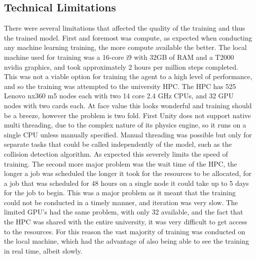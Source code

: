 \subsection{Technical Limitations}\label{sec:limitations}
There were several limitations that affected the quality of the training and thus the trained model. First and foremost was compute, as expected when conducting any machine learning training, the more compute available the better. The local machine used for training was a 16-core i9 with 32GB of RAM and a T2000 nvidia graphics, and took approximately 2 hours per million steps completed. This was not a viable option for training the agent to a high level of performance, and so the training was attempted to the university HPC. The HPC has 525 Lenovo nx360 m5 nodes each with two 14 core 2.4 GHz CPUs, and 32 GPU nodes with two cards each. At face value this looks wonderful and training should be a breeze, however the problem is two fold. First Unity does not support native multi threading, due to the complex nature of its physics engine, so it runs on a single CPU unless manually specified. Manual threading was possible but only for separate tasks that could be called independently of the model, such as the collision detection algorithm. As expected this severely limits the speed of training. The second more major problem was the wait time of the HPC, the longer a job was scheduled the longer it took for the resources to be allocated, for a job that was scheduled for 48 hours on a single node it could take up to 5 days for the job to begin. This was a major problem as it meant that the training could not be conducted in a timely manner, and iteration was very slow. The limited GPU's had the same problem, with only 32 available, and the fact that the HPC was shared with the entire university, it was very difficult to get access to the resources. For this reason the vast majority of training was conducted on the local machine, which had the advantage of also being able to see the training in real time, albeit slowly.   